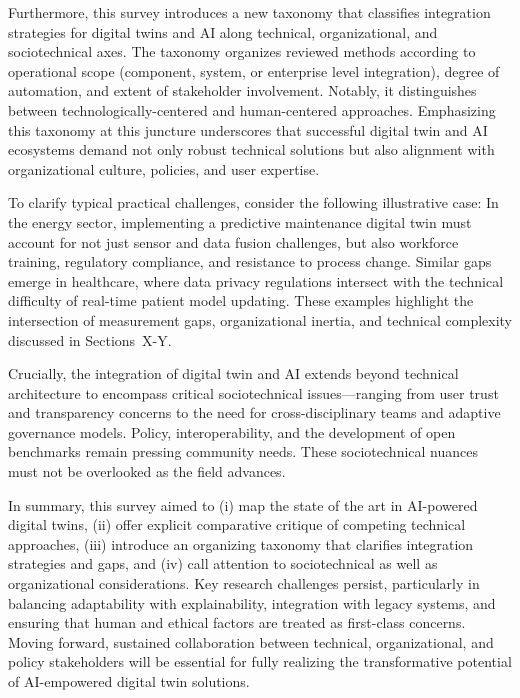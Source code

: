 \documentclass[sigconf]{acmart}
\begin{document}
Furthermore, this survey introduces a new taxonomy that classifies integration strategies for digital twins and AI along technical, organizational, and sociotechnical axes. The taxonomy organizes reviewed methods according to operational scope (component, system, or enterprise level integration), degree of automation, and extent of stakeholder involvement. Notably, it distinguishes between technologically-centered and human-centered approaches. Emphasizing this taxonomy at this juncture underscores that successful digital twin and AI ecosystems demand not only robust technical solutions but also alignment with organizational culture, policies, and user expertise.

To clarify typical practical challenges, consider the following illustrative case: In the energy sector, implementing a predictive maintenance digital twin must account for not just sensor and data fusion challenges, but also workforce training, regulatory compliance, and resistance to process change. Similar gaps emerge in healthcare, where data privacy regulations intersect with the technical difficulty of real-time patient model updating. These examples highlight the intersection of measurement gaps, organizational inertia, and technical complexity discussed in Sections~X-Y.

Crucially, the integration of digital twin and AI extends beyond technical architecture to encompass critical sociotechnical issues—ranging from user trust and transparency concerns to the need for cross-disciplinary teams and adaptive governance models. Policy, interoperability, and the development of open benchmarks remain pressing community needs. These sociotechnical nuances must not be overlooked as the field advances.

In summary, this survey aimed to (i) map the state of the art in AI-powered digital twins, (ii) offer explicit comparative critique of competing technical approaches, (iii) introduce an organizing taxonomy that clarifies integration strategies and gaps, and (iv) call attention to sociotechnical as well as organizational considerations. Key research challenges persist, particularly in balancing adaptability with explainability, integration with legacy systems, and ensuring that human and ethical factors are treated as first-class concerns. Moving forward, sustained collaboration between technical, organizational, and policy stakeholders will be essential for fully realizing the transformative potential of AI-empowered digital twin solutions.
\end{document}
